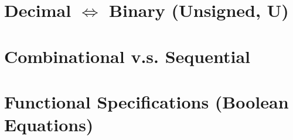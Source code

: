 \documentclass[8pt,a4paper,landscape]{extarticle}
\begin{document}
\pagestyle{empty}
\setlength{\abovedisplayskip}{1pt}
\setlength{\belowdisplayskip}{1pt}
\setlength{\abovedisplayshortskip}{0pt}
\setlength{\belowdisplayshortskip}{0pt}

\begin{multicols*}{3}

\section*{Decimal $\iff$ Binary (Unsigned, U)}


\pagebreak

\section*{Combinational v.s. Sequential}


% 

\section*{Functional Specifications (Boolean Equations)}


% 

% 



\vspace{1cm}
% 
% 

\pagebreak

\end{multicols*}
\end{document}

